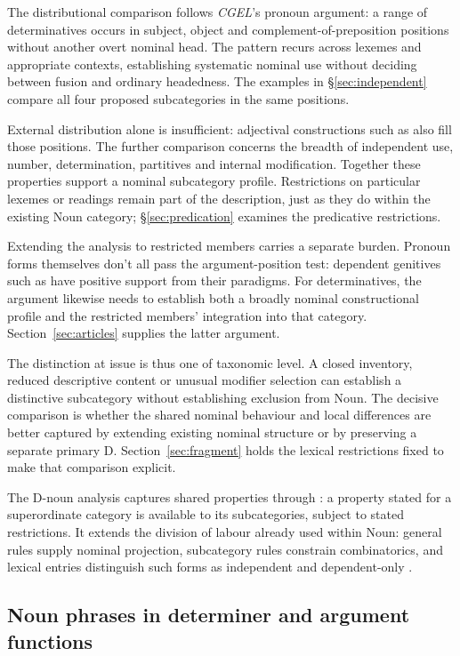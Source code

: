 \documentclass[12pt]{article}
\begin{document}
The distributional comparison follows \textit{CGEL}'s pronoun argument: a range of determinatives occurs in subject, object and complement-of-preposition positions without another overt nominal head. The pattern recurs across lexemes and appropriate contexts, establishing systematic nominal use without deciding between fusion and ordinary headedness. The examples in §\ref{sec:independent} compare all four proposed subcategories in the same positions.

External distribution alone is insufficient: adjectival constructions such as  also fill those positions. The further comparison concerns the breadth of independent use, number, determination, partitives and internal modification. Together these properties support a nominal subcategory profile. Restrictions on particular lexemes or readings remain part of the description, just as they do within the existing Noun category; §\ref{sec:predication} examines the predicative restrictions.

Extending the analysis to restricted members carries a separate burden. Pronoun forms themselves don't all pass the argument-position test: dependent genitives such as  have positive support from their paradigms. For determinatives, the argument likewise needs to establish both a broadly nominal constructional profile and the restricted members' integration into that category. Section~\ref{sec:articles} supplies the latter argument.

The distinction at issue is thus one of taxonomic level. A closed inventory, reduced descriptive content or unusual modifier selection can establish a distinctive subcategory without establishing exclusion from Noun. The decisive comparison is whether the shared nominal behaviour and local differences are better captured by extending existing nominal structure or by preserving a separate primary D. Section~\ref{sec:fragment} holds the lexical restrictions fixed to make that comparison explicit.

The D-noun analysis captures shared properties through : a property stated for a superordinate category is available to its subcategories, subject to stated restrictions. It extends the division of labour already used within Noun: general rules supply nominal projection, subcategory rules constrain combinatorics, and lexical entries distinguish such forms as independent  and dependent-only .

\subsection{Noun phrases in determiner and argument functions}\label{sec:bridge}
\end{document}
